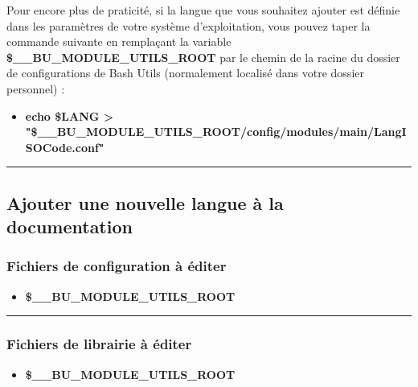 \documentclass[a4paper,10pt]{article}
\begin{document}
\begin{justify}
    Pour encore plus de praticité, si la langue que vous souhaitez ajouter est définie dans les paramètres de votre système d'exploitation, vous pouvez taper la commande suivante en remplaçant la variable \textbf{\color{orange}\$\_\_BU\_MODULE\_UTILS\_ROOT} par le chemin de la racine du dossier de configurations de Bash Utils (normalement localisé dans votre dossier personnel) :

    \begin{itemize}
        \item \textbf{\color{gray}echo \color{orange}\$LANG \color{white} > "\color{orange}\$\_\_BU\_MODULE\_UTILS\_ROOT\color{lime}/config/modules/main/LangISOCode.conf\color{white}"}
    \end{itemize}
\end{justify}




\color{green}\par\noindent\rule{\textwidth}{0.4pt}\color{white}

\color{green}
\subsection{Ajouter une nouvelle langue à la documentation}\color{white}

\color{blue}
\subsubsection{Fichiers de configuration à éditer}\color{white}

\begin{itemize}
    \item \textbf{\color{orange}\$\_\_BU\_MODULE\_UTILS\_ROOT\color{lime}}
\end{itemize}



\color{blue}\par\noindent\rule{\textwidth}{0.4pt}\color{white}

\color{blue}
\subsubsection{Fichiers de librairie à éditer}\color{white}

\begin{itemize}
    \item \textbf{\color{orange}\$\_\_BU\_MODULE\_UTILS\_ROOT\color{lime}}
\end{itemize}
\end{document}
